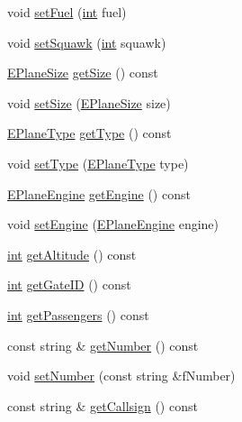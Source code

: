 \begin{DoxyCompactItemize}
void \hyperlink{classAirplane_a13aeed597173ecae5951cb9bdaf22474}{set\+Fuel} (\hyperlink{CMakeCache_8txt_a79a3d8790b2588b09777910863574e09}{int} fuel)
\item 
void \hyperlink{classAirplane_ac9106f1b9f793b2a17bb605f514e0fcf}{set\+Squawk} (\hyperlink{CMakeCache_8txt_a79a3d8790b2588b09777910863574e09}{int} squawk)
\item 
\hyperlink{Airplane_8h_a0526623f951311ba6780209b9e278dbf}{E\+Plane\+Size} \hyperlink{classAirplane_a0160009a553a9bf339892ba4c3803830}{get\+Size} () const 
\item 
void \hyperlink{classAirplane_ab88c4d346a27430d4812f37c717c26d3}{set\+Size} (\hyperlink{Airplane_8h_a0526623f951311ba6780209b9e278dbf}{E\+Plane\+Size} size)
\item 
\hyperlink{Airplane_8h_a537b68b9ecaac78d371a35d8cf7604e9}{E\+Plane\+Type} \hyperlink{classAirplane_a6ba13e6c94762127b5b87238f9fbb037}{get\+Type} () const 
\item 
void \hyperlink{classAirplane_acaf1e610b7b45804e1ae27408fd9f40f}{set\+Type} (\hyperlink{Airplane_8h_a537b68b9ecaac78d371a35d8cf7604e9}{E\+Plane\+Type} type)
\item 
\hyperlink{Airplane_8h_a3d2a8adb53da58e78cb0018d784e791d}{E\+Plane\+Engine} \hyperlink{classAirplane_a7c594903638696b53c2dd823fe33ecf2}{get\+Engine} () const 
\item 
void \hyperlink{classAirplane_a9df8583afc31aad36bf893db5fc37dbd}{set\+Engine} (\hyperlink{Airplane_8h_a3d2a8adb53da58e78cb0018d784e791d}{E\+Plane\+Engine} engine)
\item 
\hyperlink{CMakeCache_8txt_a79a3d8790b2588b09777910863574e09}{int} \hyperlink{classAirplane_ad2550909ab563f7df850f79f23c3a308}{get\+Altitude} () const 
\item 
\hyperlink{CMakeCache_8txt_a79a3d8790b2588b09777910863574e09}{int} \hyperlink{classAirplane_acab03ea6ec6df824368bf9851316e140}{get\+Gate\+ID} () const 
\item 
\hyperlink{CMakeCache_8txt_a79a3d8790b2588b09777910863574e09}{int} \hyperlink{classAirplane_acd0cbb46d1c8a17a5eb4f5ab679f2dcb}{get\+Passengers} () const 
\item 
const string \& \hyperlink{classAirplane_a2341fbcce9704ffdb81f7638ab74c0cb}{get\+Number} () const 
\item 
void \hyperlink{classAirplane_ae9eddf3e39a40dca935be7bbfd9d6f1d}{set\+Number} (const string \&f\+Number)
\item 
const string \& \hyperlink{classAirplane_a6a62bd06d28789336c5ce1543d9391f1}{get\+Callsign} () const 

\end{DoxyCompactItemize}
